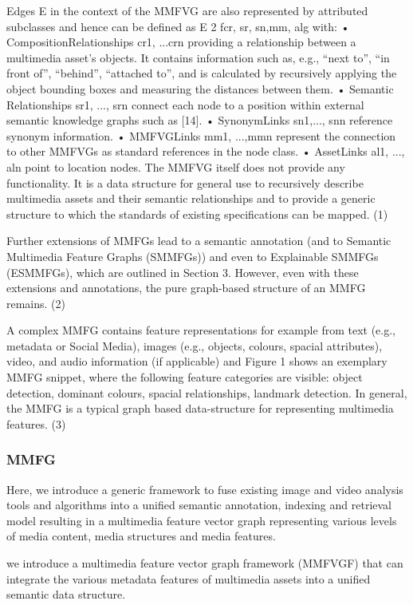 Edges E in the context of the MMFVG are also represented by attributed subclasses
and hence can be defined as E 2 fcr, sr, sn,mm, alg with:
• CompositionRelationships cr1, ...crn providing a relationship between a multimedia
asset’s objects. It contains information such as, e.g., “next to”, “in front of”, “behind”,
“attached to”, and is calculated by recursively applying the object bounding boxes and
measuring the distances between them.
• Semantic Relationships sr1, ..., srn connect each node to a position within external
semantic knowledge graphs such as [14].
• SynonymLinks sn1,..., snn reference synonym information.
• MMFVGLinks mm1, ...,mmn represent the connection to other MMFVGs as standard
references in the node class.
• AssetLinks al1, ..., aln point to location nodes.
The MMFVG itself does not provide any functionality. It is a data structure for
general use to recursively describe multimedia assets and their semantic relationships
and to provide a generic structure to which the standards of existing specifications can
be mapped. (1)

Further extensions of MMFGs lead to a semantic annotation (and
to Semantic Multimedia Feature Graphs (SMMFGs)) and even to Explainable SMMFGs
(ESMMFGs), which are outlined in Section 3. However, even with these extensions and
annotations, the pure graph-based structure of an MMFG remains. (2)


A complex MMFG contains feature representations for example from text (e.g., metadata
or Social Media), images (e.g., objects, colours, spacial attributes), video, and audio
information (if applicable) and Figure 1 shows an exemplary MMFG snippet, where the
following feature categories are visible: object detection, dominant colours, spacial relationships,
landmark detection. In general, the MMFG is a typical graph based data-structure for
representing multimedia features. (3)



\subsubsection{MMFG}
Here, we introduce a generic
framework to fuse existing image and video analysis tools and algorithms into a unified semantic
annotation, indexing and retrieval model resulting in a multimedia feature vector graph representing
various levels of media content, media structures and media features.

we introduce a multimedia feature vector graph framework (MMFVGF) that can integrate
the various metadata features of multimedia assets into a unified semantic data structure.

